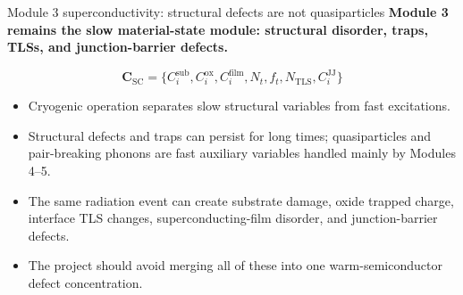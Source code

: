 \documentclass[aspectratio=169,10pt]{beamer}
\begin{document}
\begin{frame}{Module 3 superconductivity: structural defects are not quasiparticles}
\small
\textbf{Module 3 remains the slow material-state module: structural disorder, traps, TLSs, and junction-barrier defects.}

\vspace{0.2em}
\begin{equation*}
\boxed{
\mathbf C_{\mathrm{SC}}
=\{C_i^{\mathrm{sub}},C_i^{\mathrm{ox}},C_i^{\mathrm{film}},N_t,f_t,N_{\mathrm{TLS}},C_i^{\mathrm{JJ}}\}
}
\end{equation*}

\vspace{-0.1em}
\begin{itemize}
    \item Cryogenic operation separates slow structural variables from fast excitations.
    \item Structural defects and traps can persist for long times; quasiparticles and pair-breaking phonons are fast auxiliary variables handled mainly by Modules 4--5.
    \item The same radiation event can create substrate damage, oxide trapped charge, interface TLS changes, superconducting-film disorder, and junction-barrier defects.
    \item The project should avoid merging all of these into one warm-semiconductor defect concentration.
\end{itemize}
\end{frame}
\end{document}
